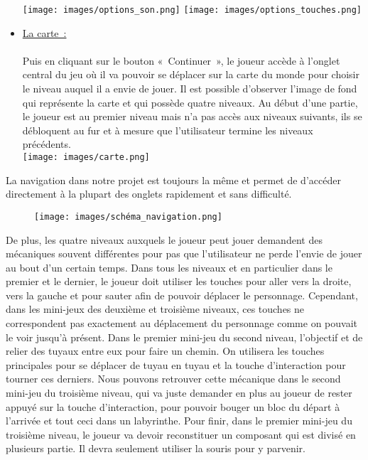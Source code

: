 \documentclass[12pt,a4paper]{article}
\begin{document}
\begin{itemize}
                \texttt{[image: images/options\_son.png]}
                \texttt{[image: images/options\_touches.png]}\\
                
                \item \tabto{1cm} \underline{La carte~:}\\\\
                \tabto{1cm} Puis en cliquant sur le bouton «~Continuer~», le joueur accède à l’onglet central du jeu où il va pouvoir se déplacer sur la carte du monde pour choisir le niveau auquel il a envie de jouer. Il est possible d'observer l’image de fond qui représente la carte et qui possède quatre niveaux. Au début d’une partie, le joueur est au premier niveau mais n’a pas accès aux niveaux suivants, ils se débloquent au fur et à mesure que l’utilisateur termine les niveaux précédents.\\

                \texttt{[image: images/carte.png]}\\
                
            \end{itemize}

            \newpage

            \tabto{1cm} La navigation dans notre projet est toujours la même et permet de d'accéder directement à la plupart des onglets rapidement et sans difficulté.\\

            \begin{figure}[h]
                \centering
                \texttt{[image: images/schéma\_navigation.png]}\\
            \end{figure}

            \tabto{1cm} De plus, les quatre niveaux auxquels le joueur peut jouer demandent des mécaniques souvent différentes pour pas que l’utilisateur ne perde l’envie de jouer au bout d’un certain temps. Dans tous les niveaux et en particulier dans le premier et le dernier, le joueur doit utiliser les touches pour aller vers la droite, vers la gauche et pour sauter afin de pouvoir déplacer le personnage. Cependant, dans les mini-jeux des deuxième et troisième niveaux, ces touches ne correspondent pas exactement au déplacement du personnage comme on pouvait le voir jusqu’à présent. Dans le premier mini-jeu du second niveau, l’objectif et de relier des tuyaux entre eux pour faire un chemin. On utilisera les touches principales pour se déplacer de tuyau en tuyau et la touche d’interaction pour tourner ces derniers. Nous pouvons retrouver cette mécanique dans le second mini-jeu du troisième niveau, qui va juste demander en plus au joueur de rester appuyé sur la touche d’interaction, pour pouvoir bouger un bloc du départ à l’arrivée et tout ceci dans un labyrinthe. Pour finir, dans le premier mini-jeu du troisième niveau, le joueur va devoir reconstituer un composant qui est divisé en plusieurs partie. Il devra seulement utiliser la souris pour y parvenir.\\
 
\end{document}
